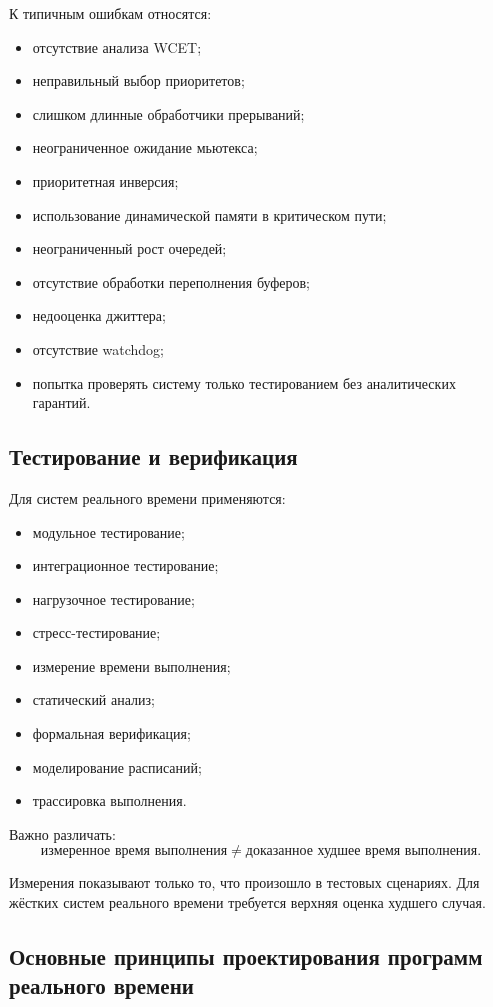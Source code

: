 \documentclass[12pt,a4paper]{article}
\begin{document}
К типичным ошибкам относятся:
\begin{itemize}
    \item отсутствие анализа WCET;
    \item неправильный выбор приоритетов;
    \item слишком длинные обработчики прерываний;
    \item неограниченное ожидание мьютекса;
    \item приоритетная инверсия;
    \item использование динамической памяти в критическом пути;
    \item неограниченный рост очередей;
    \item отсутствие обработки переполнения буферов;
    \item недооценка джиттера;
    \item отсутствие watchdog;
    \item попытка проверять систему только тестированием без аналитических гарантий.
\end{itemize}

\subsection{Тестирование и верификация}

Для систем реального времени применяются:
\begin{itemize}
    \item модульное тестирование;
    \item интеграционное тестирование;
    \item нагрузочное тестирование;
    \item стресс-тестирование;
    \item измерение времени выполнения;
    \item статический анализ;
    \item формальная верификация;
    \item моделирование расписаний;
    \item трассировка выполнения.
\end{itemize}

Важно различать:
\[
    \text{измеренное время выполнения}
    \neq
    \text{доказанное худшее время выполнения}.
\]

Измерения показывают только то, что произошло в тестовых сценариях. Для жёстких систем реального времени требуется верхняя оценка худшего случая.

\subsection{Основные принципы проектирования программ реального времени}
\end{document}
